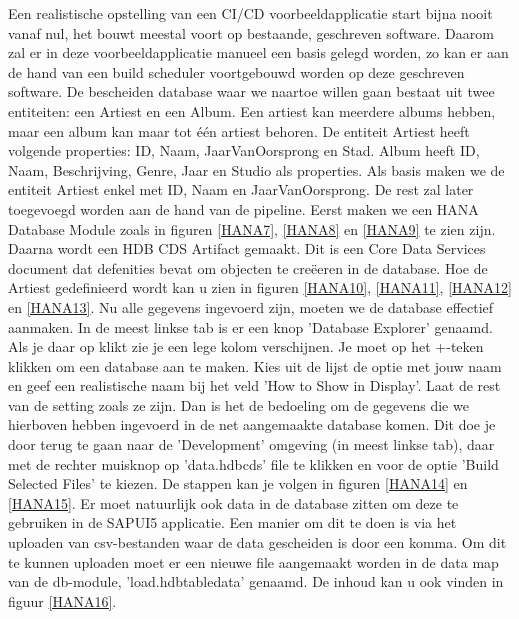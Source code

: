             Een realistische opstelling van een CI/CD voorbeeldapplicatie start bijna nooit vanaf nul, het bouwt meestal voort op bestaande, geschreven software.
            Daarom zal er in deze voorbeeldapplicatie manueel een basis gelegd worden, zo kan er aan de hand van een build scheduler voortgebouwd worden op deze geschreven software.
            De bescheiden database waar we naartoe willen gaan bestaat uit twee entiteiten: een Artiest en een Album. Een artiest kan meerdere albums hebben, maar een album kan maar tot één artiest behoren. De entiteit Artiest heeft volgende properties: ID, Naam, JaarVanOorsprong en Stad. Album heeft ID, Naam, Beschrijving, Genre, Jaar en Studio als properties. Als basis maken we de entiteit Artiest enkel met ID, Naam en JaarVanOorsprong. De rest zal later toegevoegd worden aan de hand van de pipeline.
            Eerst maken we een HANA Database Module zoals in figuren \ref{HANA7}, \ref{HANA8} en \ref{HANA9} te zien zijn. Daarna wordt een HDB CDS Artifact gemaakt. Dit is een Core Data Services document dat defenities bevat om objecten te creëeren in de database. Hoe de Artiest gedefinieerd wordt kan u zien in figuren \ref{HANA10}, \ref{HANA11}, \ref{HANA12} en \ref{HANA13}.
            Nu alle gegevens ingevoerd zijn, moeten we de database effectief aanmaken. In de meest linkse tab is er een knop 'Database Explorer' genaamd. Als je daar op klikt zie je een lege kolom verschijnen. Je moet op het +-teken klikken om een database aan te maken. Kies uit de lijst de optie met jouw naam en geef een realistische naam bij het veld 'How to Show in Display'. Laat de rest van de setting zoals ze zijn.
            Dan is het de bedoeling om de gegevens die we hierboven hebben ingevoerd in de net aangemaakte database komen. Dit doe je door terug te gaan naar de 'Development' omgeving (in meest linkse tab), daar met de rechter muisknop op 'data.hdbcds' file te klikken en voor de optie 'Build Selected Files' te kiezen. De stappen kan je volgen in figuren \ref{HANA14} en \ref{HANA15}.
            Er moet natuurlijk ook data in de database zitten om deze te gebruiken in de SAPUI5 applicatie. Een manier om dit te doen is via het uploaden van csv-bestanden waar de data gescheiden is door een komma. Om dit te kunnen uploaden moet er een nieuwe file aangemaakt worden in de data map van de db-module, 'load.hdbtabledata' genaamd. De inhoud kan u ook vinden in figuur \ref{HANA16}.
